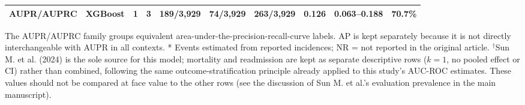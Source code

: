 \begin{table}[H]
\begin{adjustbox}{max width=\textwidth}
\begin{tabular}{llcccccccc}
    AUPR/AUPRC & XGBoost & 1 & 3 & 189/3,929 & 74/3,929 & 263/3,929 & 0.126 & 0.063--0.188 & 70.7\% \\
\bottomrule
\end{tabular}
\end{adjustbox}
\par\vspace{0.4em}\footnotesize The AUPR/AUPRC family groups equivalent area-under-the-precision-recall-curve labels. AP is kept separately because it is not directly interchangeable with AUPR in all contexts. * Events estimated from reported incidences; NR = not reported in the original article. $^\dagger$Sun M. et al. (2024) is the sole source for this model; mortality and readmission are kept as separate descriptive rows ($k=1$, no pooled effect or CI) rather than combined, following the same outcome-stratification principle already applied to this study's AUC-ROC estimates. These values should not be compared at face value to the other rows (see the discussion of Sun M. et al.'s evaluation prevalence in the main manuscript).
\end{table}
